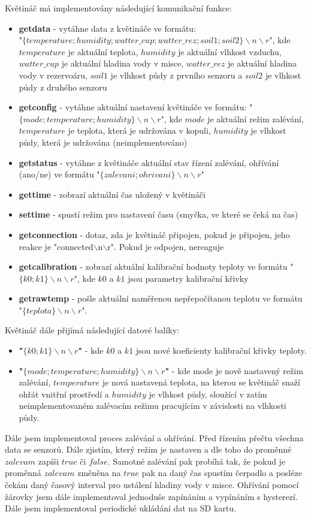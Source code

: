 \documentclass[11pt,a4paper]{article}
\begin{document}
	Květináč má implementovány následující komunikační funkce:
	\begin{itemize}
		\item \textbf{getdata} - vytáhne data z květináče ve formátu:\\ "$\{temperature;humidity;watter\_cup;watter\_rez;soil1;soil2\}\backslash n\backslash r$", kde $temperature$ je aktuální teplota, $humidity$ je aktuální vlhkost vzduchu, $watter\_cup$ je aktuální hladina vody v misce, $watter\_rez$ je aktuální hladina vody v rezervoáru, $soil1$ je vlhkost půdy z prvního senzoru a $soil2$ je vlhkost půdy z druhého senzoru
		\item \textbf{getconfig} - vytáhne aktuální nastavení květináče ve formátu: "$\{mode;temperature;humidity\}\backslash n\backslash r$", kde $mode$ je aktuální režim zalévání, $temperature$ je teplota, která je udržována v kopuli, $humidity$ je vlhkost půdy, která je udržována (neimplementováno)
		\item \textbf{getstatus} - vytáhne z květináče aktuální stav řízení zalévání, ohřívání (ano/ne) ve formátu "$\{zalevani;ohrivani\}\backslash n\backslash r$"
		\item \textbf{gettime} - zobrazí aktuální čas uložený v květináči
		\item \textbf{settime} - spustí režim pro nastavení času (smyčka, ve které se čeká na čas)
		\item \textbf{getconnection} - dotaz, zda je květináč připojen, pokud je připojen, jeho reakce je "connected$\backslash$n$\backslash$r". Pokud je odpojen, nereaguje
		\item \textbf{getcalibration} - zobrazí aktuální kalibrační hodnoty teploty ve formátu "$\{k0;k1\}\backslash n\backslash r$", kde $k0$ a $k1$ jsou parametry kalibrační křivky
		\item \textbf{getrawtemp} - pošle aktuální naměřenou nepřepočítanou teplotu ve formátu "$\{teplota\}\backslash n\backslash r$".
	\end{itemize}
	Květináč dále přijímá následující datové balíky:
	\begin{itemize}
		\item \textbf{"$\{k0;k1\}\backslash n\backslash r$"} - kde $k0$ a $k1$ jsou nové koeficienty kalibrační křivky teploty.
		\item \textbf{"$\{mode;temperature;humidity\}\backslash n\backslash r$"} - kde mode je nově nastavený režim zalévání, $temperature$ je nová nastavená teplota, na kterou se květináč snaží ohřát vnitřní prostředí a $humidity$ je vlhkost půdy, sloužící v zatím neimplementovaném zalévacím režimu pracujícím v závislosti na vlhkosti půdy. 
	\end{itemize}
	Dále jsem implementoval proces zalévání a ohřívání. Před řízením přečtu všechna data se senzorů. Dále zjistím, který režim je nastaven a dle toho do proměnné $zalevam$ zapíši $true$ či $false$. Samotné zalévání pak probíhá tak, že pokud je proměnná $zalevam$ změněna na $true$ pak na daný čas spustím čerpadlo a posléze čekám daný časový interval pro ustálení hladiny vody v misce. Ohřívání pomocí žárovky jsem dále implementoval jednoduše zapínáním a vypínáním s hysterezí.
	Dále jsem implementoval periodické ukládání dat na SD kartu.
	
\end{document}
